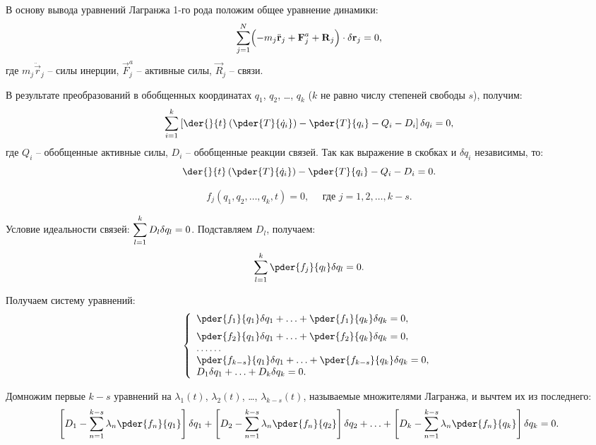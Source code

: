 
В основу вывода уравнений Лагранжа 1-го рода положим общее уравнение динамики:
\[
    \sum\limits_{j=1}^N \Bigl(-m_j\ddot{\vec{r}}_j + \vec{F}^a_j + \vec{R}_j
    \Bigr)\cdot\delta\vec{r}_j = 0,
\]
где \( m_j\ddot{\vec{r}}_j \) -- силы инерции, \( \vec{F}^a_j \) -- активные
силы, \( \vec{R}_j \) -- связи.


В результате преобразований в обобщенных координатах \( q_1 \), \( q_2 \),
\ldots, \( q_k \) (\( k \) не равно числу степеней свободы \( s \)), получим:
\[
    \sum\limits_{i=1}^k \left[\der{}{t}\left(\pder{T}{\dot{q}_i}\right) -
    \pder{T}{q_i} - Q_i - D_i\right]\delta q_i = 0,
\]
где \( Q_i \) -- обобщенные активные силы, \( D_i \) -- обобщенные реакции
связей. Так как выражение в скобках и \( \delta q_i \) независимы, то:
\[
    \der{}{t}\left(\pder{T}{\dot{q}_i}\right) - \pder{T}{q_i} - Q_i - D_i = 0.
\]


\[
    f_j(q_1, q_2, \ldots, q_k, t) = 0, \quad \text{ где } j = 1, 2, \ldots, k-s.
\]

Условие идеальности связей: \( \ds \sum_{l=1}^k D_l\delta q_l = 0 \).
Подставляем \( D_l \), получаем:
\[
    \sum\limits_{l=1}^k \pder{f_j}{q_l}\delta q_l = 0.
\]

Получаем систему уравнений:
\[
    \left\{ \begin{array}{l}
       \ds\pder{f_1}{q_1}\delta q_1+\ldots+\pder{f_1}{q_k}\delta q_k =0,\\[.6em]
       \ds \pder{f_2}{q_1}\delta q_1 + \ldots + \pder{f_2}{q_k}\delta q_k = 0,\\
       \ldots\ldots \\
       \ds \pder{f_{k-s}}{q_1}\delta q_1 + \ldots + \pder{f_{k-s}}{q_k}\delta
       q_k = 0, \\
       D_1\delta q_1 + \ldots + D_k \delta q_k = 0.
    \end{array} \right.
\]

Домножим первые \( k - s \) уравнений на \( \lambda_1(t) \), \( \lambda_2(t) \),
\ldots, \( \lambda_{k-s}(t) \), называемые множителями Лагранжа, и вычтем их из
последнего:
\[
    \left[D_1 - \sum_{n=1}^{k-s}\lambda_n\pder{f_n}{q_1}\right]\delta q_1 +
    \left[D_2 - \sum_{n=1}^{k-s}\lambda_n\pder{f_n}{q_2}\right]\delta q_2 +
    \ldots +
    \left[D_k - \sum_{n=1}^{k-s}\lambda_n\pder{f_n}{q_k}\right]\delta q_k = 0.
\]

